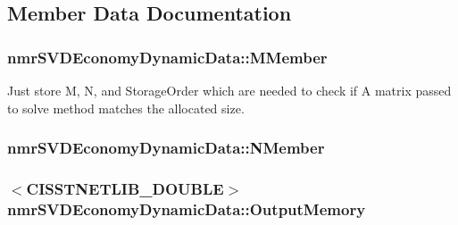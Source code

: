 \subsection{Member Data Documentation}
\hypertarget{classnmr_s_v_d_economy_dynamic_data_a850f29c6d2376c0f87b56b66c0fccfa5}{
\subsubsection[{M\-Member}]{ nmr\-S\-V\-D\-Economy\-Dynamic\-Data\-::\-M\-Member\hspace{0.3cm}{\ttfamily [protected]}}}\label{classnmr_s_v_d_economy_dynamic_data_a850f29c6d2376c0f87b56b66c0fccfa5}
Just store M, N, and Storage\-Order which are needed to check if A matrix passed to solve method matches the allocated size. \hypertarget{classnmr_s_v_d_economy_dynamic_data_ae4ce223f5b2cd6171d09810aa08a7a8b}{
\subsubsection[{N\-Member}]{ nmr\-S\-V\-D\-Economy\-Dynamic\-Data\-::\-N\-Member\hspace{0.3cm}{\ttfamily [protected]}}}\label{classnmr_s_v_d_economy_dynamic_data_ae4ce223f5b2cd6171d09810aa08a7a8b}
\hypertarget{classnmr_s_v_d_economy_dynamic_data_ad990316888e2acec08d79e59a4284fa4}{
\subsubsection[{Output\-Memory}]{$<$C\-I\-S\-S\-T\-N\-E\-T\-L\-I\-B\-\_\-\-D\-O\-U\-B\-L\-E$>$ nmr\-S\-V\-D\-Economy\-Dynamic\-Data\-::\-Output\-Memory\hspace{0.3cm}{\ttfamily [protected]}}}\label{classnmr_s_v_d_economy_dynamic_data_ad990316888e2acec08d79e59a4284fa4}
